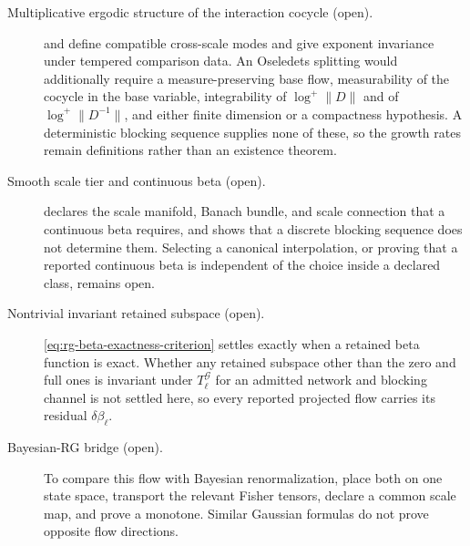 \begin{description}
\item[Multiplicative ergodic structure of the interaction cocycle (open).]
 and  define compatible
cross-scale modes and give exponent invariance under tempered comparison data.
An Oseledets splitting would additionally require a measure-preserving base
flow, measurability of the cocycle in the base variable, integrability of
\(\log^+\lVert D\rVert\) and of \(\log^+\lVert D^{-1}\rVert\), and either finite
dimension or a compactness hypothesis.  A deterministic blocking sequence
supplies none of these, so the growth rates remain definitions rather than an
existence theorem. 

\item[Smooth scale tier and continuous beta (open).]
 declares the scale manifold, Banach bundle, and
scale connection that a continuous beta requires, and
 shows that a discrete blocking
sequence does not determine them.  Selecting a canonical interpolation, or
proving that a reported continuous beta is independent of the choice inside a
declared class, remains open. 

\item[Nontrivial invariant retained subspace (open).]
\eqref{eq:rg-beta-exactness-criterion} settles exactly when a retained beta
function is exact.  Whether any retained subspace other than the zero and full
ones is invariant under \(T_\ell^{\mathcal G}\) for an admitted network and
blocking channel is not settled here, so every reported projected flow carries
its residual \(\delta\beta_\ell\). 

\item[Bayesian-RG bridge (open).]
To compare this flow with Bayesian renormalization, place both on one state
space, transport the relevant Fisher tensors, declare a common scale map,
and prove a monotone.  Similar Gaussian formulas do not prove opposite flow
directions. 


\end{description}
